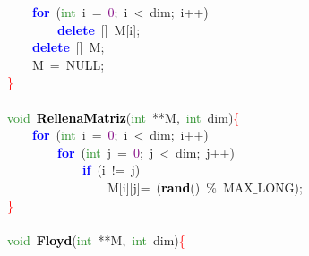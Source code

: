 \mbox{}\ \ \ \ \textbf{\textcolor{Blue}{for}}\ \textcolor{BrickRed}{(}\textcolor{ForestGreen}{int}\ i\ \textcolor{BrickRed}{=}\ \textcolor{Purple}{0}\textcolor{BrickRed}{;}\ i\ \textcolor{BrickRed}{\textless{}}\ dim\textcolor{BrickRed}{;}\ i\textcolor{BrickRed}{++)} \\
\mbox{}\ \ \ \ \ \ \ \ \textbf{\textcolor{Blue}{delete}}\ \textcolor{BrickRed}{[]}\ M\textcolor{BrickRed}{[}i\textcolor{BrickRed}{];} \\
\mbox{}\ \ \ \ \textbf{\textcolor{Blue}{delete}}\ \textcolor{BrickRed}{[]}\ M\textcolor{BrickRed}{;} \\
\mbox{}\ \ \ \ M\ \textcolor{BrickRed}{=}\ NULL\textcolor{BrickRed}{;} \\
\mbox{}\textcolor{Red}{\}}\ \ \ \ \ \ \  \\
\mbox{} \\
\mbox{}\textcolor{ForestGreen}{void}\ \textbf{\textcolor{Black}{RellenaMatriz}}\textcolor{BrickRed}{(}\textcolor{ForestGreen}{int}\ \textcolor{BrickRed}{**}M\textcolor{BrickRed}{,}\ \textcolor{ForestGreen}{int}\ dim\textcolor{BrickRed}{)}\textcolor{Red}{\{} \\
\mbox{}\ \ \ \ \textbf{\textcolor{Blue}{for}}\ \textcolor{BrickRed}{(}\textcolor{ForestGreen}{int}\ i\ \textcolor{BrickRed}{=}\ \textcolor{Purple}{0}\textcolor{BrickRed}{;}\ i\ \textcolor{BrickRed}{\textless{}}\ dim\textcolor{BrickRed}{;}\ i\textcolor{BrickRed}{++)} \\
\mbox{}\ \ \ \ \ \ \ \ \textbf{\textcolor{Blue}{for}}\ \textcolor{BrickRed}{(}\textcolor{ForestGreen}{int}\ j\ \textcolor{BrickRed}{=}\ \textcolor{Purple}{0}\textcolor{BrickRed}{;}\ j\ \textcolor{BrickRed}{\textless{}}\ dim\textcolor{BrickRed}{;}\ j\textcolor{BrickRed}{++)} \\
\mbox{}\ \ \ \ \ \ \ \ \ \ \ \ \textbf{\textcolor{Blue}{if}}\ \textcolor{BrickRed}{(}i\ \textcolor{BrickRed}{!=}\ j\textcolor{BrickRed}{)} \\
\mbox{}\ \ \ \ \ \ \ \ \ \ \ \ \ \ \ \ M\textcolor{BrickRed}{[}i\textcolor{BrickRed}{][}j\textcolor{BrickRed}{]=}\ \textcolor{BrickRed}{(}\textbf{\textcolor{Black}{rand}}\textcolor{BrickRed}{()}\ \textcolor{BrickRed}{\%}\ MAX$\_$LONG\textcolor{BrickRed}{);} \\
\mbox{}\textcolor{Red}{\}}\ \ \ \ \ \ \ \ \ \ \  \\
\mbox{}\ \ \ \  \\
\mbox{}\textcolor{ForestGreen}{void}\ \textbf{\textcolor{Black}{Floyd}}\textcolor{BrickRed}{(}\textcolor{ForestGreen}{int}\ \textcolor{BrickRed}{**}M\textcolor{BrickRed}{,}\ \textcolor{ForestGreen}{int}\ dim\textcolor{BrickRed}{)}\textcolor{Red}{\{} \\
